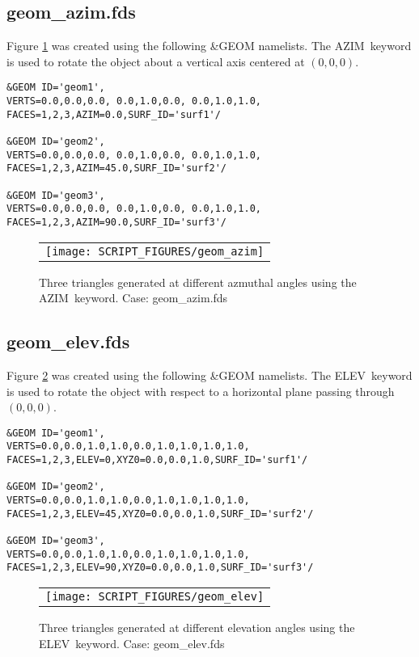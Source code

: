 \documentclass[12pt]{article}
\begin{document}
\subsection{geom\_azim.fds}
Figure \ref{fig:geom_azim} was created using the following \&GEOM namelists.
The {\ct AZIM}\ keyword is used to rotate the object about a vertical axis
centered at $(0,0,0)$.

{\small
\begin{verbatim}
&GEOM ID='geom1',
VERTS=0.0,0.0,0.0, 0.0,1.0,0.0, 0.0,1.0,1.0,
FACES=1,2,3,AZIM=0.0,SURF_ID='surf1'/

&GEOM ID='geom2',
VERTS=0.0,0.0,0.0, 0.0,1.0,0.0, 0.0,1.0,1.0,
FACES=1,2,3,AZIM=45.0,SURF_ID='surf2'/

&GEOM ID='geom3',
VERTS=0.0,0.0,0.0, 0.0,1.0,0.0, 0.0,1.0,1.0,
FACES=1,2,3,AZIM=90.0,SURF_ID='surf3'/
\end{verbatim}
}

\begin{figure}[\figoptions]
\begin{center}
\begin{tabular}{c}
 \texttt{[image: SCRIPT\_FIGURES/geom\_azim]}
  \end{tabular}
\end{center}
 \caption{Three triangles generated at different azmuthal angles using the {\ct AZIM}\ keyword. Case: geom\_azim.fds}
\label{fig:geom_azim}
\end{figure}

\subsection{geom\_elev.fds}
Figure \ref{fig:geom_elev} was created using the following \&GEOM namelists.
The {\ct ELEV}\ keyword is used to rotate the object with respect to a horizontal plane
passing through $(0,0,0)$.

{\small
\begin{verbatim}
&GEOM ID='geom1',
VERTS=0.0,0.0,1.0,1.0,0.0,1.0,1.0,1.0,1.0,
FACES=1,2,3,ELEV=0,XYZ0=0.0,0.0,1.0,SURF_ID='surf1'/

&GEOM ID='geom2',
VERTS=0.0,0.0,1.0,1.0,0.0,1.0,1.0,1.0,1.0,
FACES=1,2,3,ELEV=45,XYZ0=0.0,0.0,1.0,SURF_ID='surf2'/

&GEOM ID='geom3',
VERTS=0.0,0.0,1.0,1.0,0.0,1.0,1.0,1.0,1.0,
FACES=1,2,3,ELEV=90,XYZ0=0.0,0.0,1.0,SURF_ID='surf3'/
\end{verbatim}
}

\begin{figure}[\figoptions]
\begin{center}
\begin{tabular}{c}
 \texttt{[image: SCRIPT\_FIGURES/geom\_elev]}
  \end{tabular}
\end{center}
 \caption{Three triangles generated at different elevation angles using the {\ct ELEV}\ keyword. Case: geom\_elev.fds}
\label{fig:geom_elev}
\end{figure}
\end{document}
